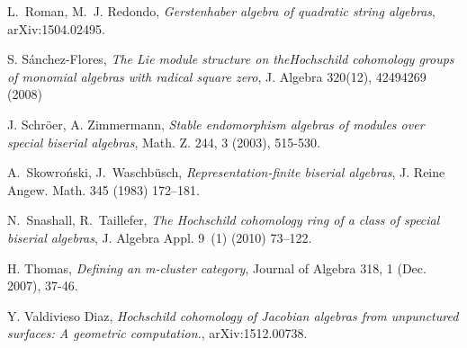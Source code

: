 \documentclass{amsart}
\theoremstyle{plain}
\theoremstyle{definition}
\begin{document}
\begin{thebibliography}{10}
 L.~Roman, M.~J. Redondo, \textit{Gerstenhaber algebra of quadratic string algebras}, arXiv:1504.02495.

 S. Sánchez-Flores, \textit{ The Lie module structure on theHochschild cohomology groups of monomial
algebras with radical square zero}, J. Algebra 320(12), 42494269 (2008)

 J. Schröer, A. Zimmermann,  \textit{Stable endomorphism algebras of modules over special biserial algebras}, Math. Z. 244, 3 (2003), 515-530.

 A.~Skowro{\'n}ski, J.~Waschb{\"u}sch,  \textit{Representation-finite biserial algebras},
  J. Reine Angew. Math. 345 (1983) 172--181.

 N.~Snashall, R.~Taillefer, \textit{The {H}ochschild cohomology ring of a class of special biserial algebras}, J. Algebra Appl. 9~(1) (2010) 73--122.

 H. Thomas,  \textit{Defining an m-cluster category}, Journal of Algebra 318, 1 (Dec. 2007), 37-46.

 Y. Valdivieso Diaz,  \textit{Hochschild cohomology of Jacobian algebras from unpunctured surfaces: A geometric computation.}, arXiv:1512.00738.

\end{thebibliography}
\end{document}
